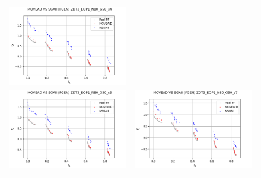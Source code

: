 \begin{figure}[H]
\begin{tabular}{c c}
    \includegraphics[scale=0.5]{figures/ZDT3_EOP1_N80_G50_T12/s4_comp.png}\\
    \includegraphics[scale=0.5]{figures/ZDT3_EOP1_N80_G50_T12/s5_comp.png} &
    \includegraphics[scale=0.5]{figures/ZDT3_EOP1_N80_G50_T12/s7_comp.png}\\

\end{tabular}
\end{figure}
